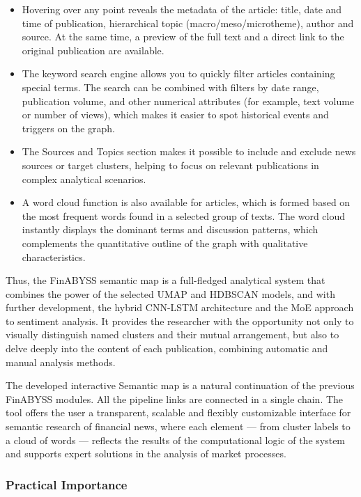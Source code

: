 \begin{itemize}
    \item Hovering over any point reveals the metadata of the article: title, date and time of publication,
    hierarchical topic (macro/meso/microtheme), author and source. At the same time, a preview of the full
    text and a direct link to the original publication are available.
    \item The keyword search engine allows you to quickly filter articles containing special terms. The search
    can be combined with filters by date range, publication volume, and other numerical attributes (for example,
    text volume or number of views), which makes it easier to spot historical events and triggers on the graph.
    \item The Sources and Topics section makes it possible to include and exclude news sources or target clusters,
    helping to focus on relevant publications in complex analytical scenarios.
    \item A word cloud function is also available for articles, which is formed based on the most frequent words
    found in a selected group of texts. The word cloud instantly displays the dominant terms and discussion patterns,
    which complements the quantitative outline of the graph with qualitative characteristics.
\end{itemize}

Thus, the FinABYSS semantic map is a full-fledged analytical system that combines the power of the selected UMAP
and HDBSCAN models, and with further development, the hybrid CNN-LSTM architecture and the MoE approach to sentiment
analysis. It provides the researcher with the opportunity not only to visually distinguish named clusters and
their mutual arrangement, but also to delve deeply into the content of each publication, combining automatic and
manual analysis methods.

The developed interactive Semantic map is a natural continuation of the previous FinABYSS modules. All the pipeline
links are connected in a single chain. The tool offers the user a transparent, scalable and flexibly customizable
interface for semantic research of financial news, where each element --- from cluster labels to a cloud
of words --- reflects the results of the computational logic of the system and supports expert solutions
in the analysis of market processes.

\subsubsection{Practical Importance}

